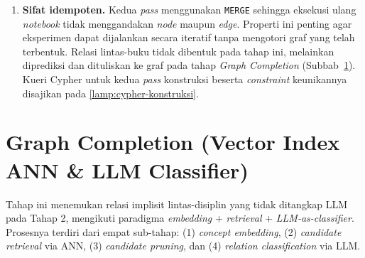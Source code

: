 \documentclass[../../thesis]{subfiles}
\begin{document}
\begin{enumerate}
  \item \textbf{Sifat idempoten.} Kedua \textit{pass} menggunakan
  \texttt{MERGE} sehingga eksekusi ulang \textit{notebook} tidak menggandakan
  \textit{node} maupun \textit{edge}. Properti ini penting agar eksperimen dapat
  dijalankan secara iteratif tanpa mengotori graf yang telah terbentuk. Relasi
  lintas-buku tidak dibentuk pada tahap ini, melainkan diprediksi dan dituliskan
  ke graf pada tahap \textit{Graph Completion} (Subbab~\ref{sec:graph-completion}).
  Kueri Cypher untuk kedua \textit{pass} konstruksi beserta \textit{constraint}
  keunikannya disajikan pada \ref{lamp:cypher-konstruksi}.
\end{enumerate}

\section{Graph Completion (Vector Index ANN \& LLM Classifier)}\label{sec:graph-completion}

Tahap ini menemukan relasi implisit lintas-disiplin yang tidak ditangkap LLM
pada Tahap 2, mengikuti paradigma \textit{embedding} + \textit{retrieval} + \textit{LLM-as-classifier}.
Prosesnya terdiri dari empat sub-tahap: (1) \textit{concept embedding},
(2) \textit{candidate retrieval} via ANN, (3) \textit{candidate pruning},
dan (4) \textit{relation classification} via LLM.
\end{document}

